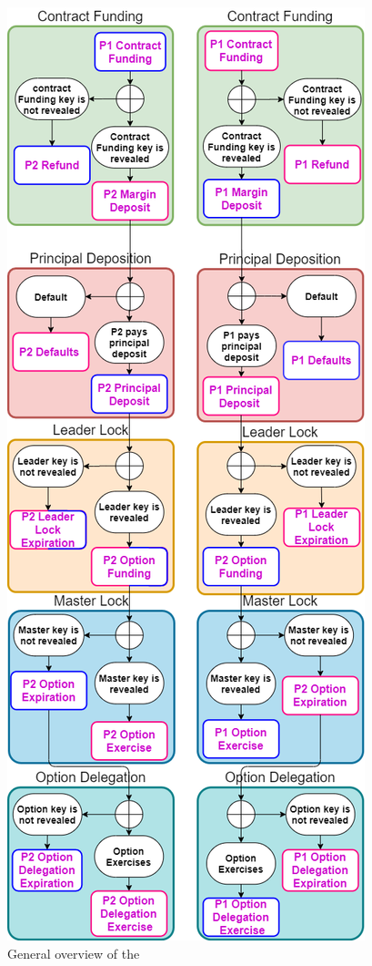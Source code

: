 \begin{figure}
    \includegraphics[width=\textwidth,height=\textheight,keepaspectratio]{figures/meta-swaption.png}
    \caption{General overview of the \MetaSwaption}
    \label{fig:moc-swaption}
\end{figure}

